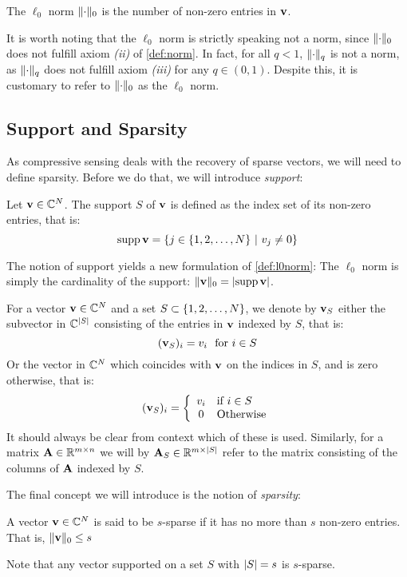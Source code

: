 \begin{definition} \label{def:l0norm}
	The $ \ell_{0} $ norm $ \lVert\cdot\rVert_{0} $ is the number of non-zero entries in $ \mathbf{v} $.
\end{definition}

It is worth noting that the $ \ell_{0} $ norm is strictly speaking not a norm, since $ \lVert\cdot\rVert_{0} $ does not fulfill axiom \textit{(ii)} of \cref{def:norm}. In fact, for all $ q<1 $, $ \lVert\cdot\rVert_{q} $ is not a norm, as $ \lVert\cdot\rVert_{q} $ does not fulfill axiom \textit{(iii)} for any $ q \in (0, 1) $. Despite this, it is customary to refer to $ \lVert\cdot\rVert_{0} $ as the $ \ell_{0} $ norm.

\subsection{Support and Sparsity}
As compressive sensing deals with the recovery of sparse vectors, we will need to define sparsity. Before we do that, we will introduce \textit{support}:

\begin{definition} \label{def:support}
	Let $ \mathbf{v} \in \mathbb{C}^{N} $. The support $ S $ of $ \mathbf{v} $ is defined as the index set of its non-zero entries, that is:
	\[
		\operatorname{supp} \mathbf{v} = \{j \in \{1, 2, \ldots, N\} ~|~ v_{j} \neq 0\}
	\]
\end{definition}

The notion of support yields a new formulation of \cref{def:l0norm}: The $ \ell_{0} $ norm is simply the cardinality of the support: $ \lVert\mathbf{v}\rVert_{0} = \left|\operatorname{supp} \mathbf{v}\right| $.

For a vector $ \mathbf{v}\in\mathbb{C}^{N} $ and a set $ S \subset \{1, 2, \ldots, N\} $, we denote by $ \mathbf{v}_{S} $ either the subvector in $ \mathbb{C}^{\left|S\right|} $ consisting of the entries in $ \mathbf{v} $ indexed by $ S $, that is:
\begin{equation}
	\label{eq:vSalt1}
	(\mathbf{v}_{S})_{i} = v_{i} \text{~~for } i \in S
\end{equation}
Or the vector in $ \mathbb{C}^{N} $ which coincides with $ \mathbf{v} $ on the indices in $ S $, and is zero otherwise, that is:
\begin{equation}
	\label{eq:vSalt2}
	(\mathbf{v}_{S})_{i} = \left\{ \begin{array}{cl} v_{i} & \text{if } i \in S \\ 0 & \text{Otherwise} \end{array} \right.
\end{equation}
It should always be clear from context which of these is used. Similarly, for a matrix $ \mathbf{A}\in\mathbb{R}^{m \times n} $ we will by $ \mathbf{A}_{S} \in \mathbb{R}^{m \times \left|S\right|} $ refer to the matrix consisting of the columns of $ \mathbf{A} $ indexed by $ S $.

The final concept we will introduce is the notion of \textit{sparsity}:

\begin{definition} A vector $ \mathbf{v} \in \mathbb{C}^{N} $ is said to be $ s $-sparse if it has no more than $ s $ non-zero entries. That is, $ \lVert\mathbf{v}\rVert_{0} \leq s $
\end{definition}

Note that any vector supported on a set $ S $ with $ \left|S\right| = s $ is $ s $-sparse. 